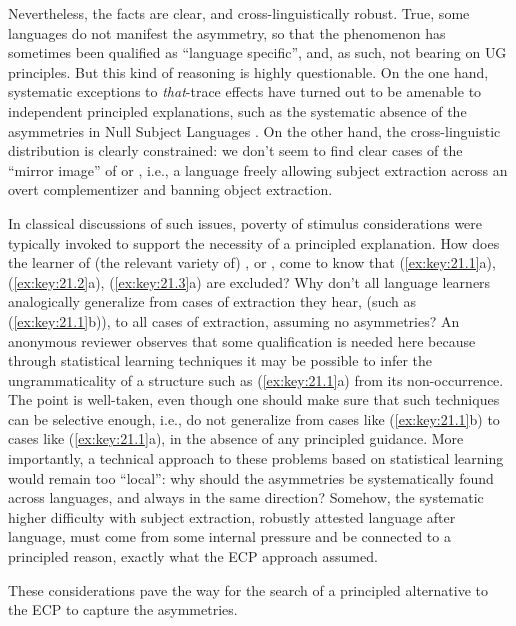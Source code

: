 \documentclass[output=paper]{langsci/langscibook}
\begin{document}
Nevertheless, the facts are clear, and cross-linguistically robust. True, some
languages do not manifest the asymmetry, so that the phenomenon has sometimes
been qualified as “language specific”, and, as such, not bearing on
\gls{UG}
principles. But this kind of reasoning is highly questionable. On the one hand,
systematic exceptions to \emph{that}-trace effects have turned out to be
amenable to independent principled explanations, such as the systematic absence
of the asymmetries in Null Subject Languages \citep{Rizzi:1982}. On the other
hand, the cross-linguistic distribution is clearly constrained: we don’t seem
to find clear cases of the “mirror image” of  or , i.e., a
language freely allowing subject extraction across an overt complementizer and
banning object extraction.

In classical discussions of such issues, poverty of stimulus considerations
were typically invoked to support the necessity of a principled explanation.
How does the learner of (the relevant variety of) , or ,
come to know that (\ref{ex:key:21.1}a), (\ref{ex:key:21.2}a),
(\ref{ex:key:21.3}a) are excluded? Why don’t all language learners analogically
generalize from cases of extraction they hear, (such as (\ref{ex:key:21.1}b)),
to all cases of extraction, assuming no asymmetries? An anonymous reviewer
observes that some qualification is needed here because through statistical
learning techniques it may be possible to infer the ungrammaticality of a
structure such as (\ref{ex:key:21.1}a) from its non-occurrence. The point is
well-taken, even though one should make sure that such techniques can be
selective enough, i.e., do not generalize from cases like (\ref{ex:key:21.1}b)
to cases like (\ref{ex:key:21.1}a), in the absence of any principled guidance.
More importantly, a  technical approach to these problems based on statistical
learning would remain too “local”:  why should the asymmetries be
systematically found across languages, and always in the same direction?
Somehow, the systematic higher difficulty with subject extraction, robustly
attested language after language, must come from some internal pressure and be
connected to a principled reason, exactly what the \gls{ECP} approach assumed.

These considerations pave the way for the search of a principled alternative to
the \gls{ECP} to capture the asymmetries.
\end{document}
